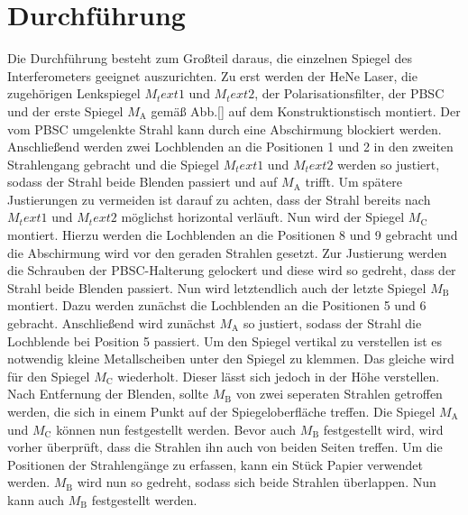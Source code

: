 
\section{Durchführung}
\label{sec:Durchführung}
Die Durchführung besteht zum Großteil daraus, die einzelnen Spiegel des Interferometers geeignet auszurichten. %
Zu erst werden der HeNe Laser, die zugehörigen Lenkspiegel $M_text{1}$ und $M_text{2}$, der Polarisationsfilter, der PBSC und der erste Spiegel $M_\text{A}$ gemäß Abb.\ref{} auf dem Konstruktionstisch montiert. Der vom PBSC umgelenkte Strahl kann durch eine Abschirmung blockiert werden. Anschließend werden zwei Lochblenden an die Positionen 1 und 2 in den zweiten Strahlengang gebracht und die Spiegel $M_text{1}$ und $M_text{2}$ werden so justiert, sodass der Strahl beide Blenden passiert und auf $M_\text{A}$ trifft. Um spätere Justierungen zu vermeiden ist darauf zu achten, dass der Strahl bereits nach $M_text{1}$ und $M_text{2}$ möglichst horizontal verläuft.  Nun wird der Spiegel $M_\text{C}$ montiert. Hierzu werden die Lochblenden an die Positionen 8 und 9 gebracht und die Abschirmung wird vor den geraden Strahlen gesetzt. 
Zur Justierung werden die Schrauben der PBSC-Halterung gelockert und diese wird so gedreht, dass der Strahl beide Blenden passiert. Nun wird letztendlich auch der letzte Spiegel $M_\text{B}$ montiert. Dazu werden zunächst die Lochblenden an die Positionen 5 und 6 gebracht. Anschließend wird zunächst $M_\text{A}$ so justiert, sodass der Strahl die Lochblende bei Position 5 passiert. Um den Spiegel vertikal zu verstellen ist es notwendig kleine Metallscheiben unter den Spiegel zu klemmen. Das gleiche wird für den Spiegel $M_\text{C}$ wiederholt. Dieser lässt sich jedoch in der Höhe verstellen. Nach Entfernung der Blenden, sollte $M_\text{B}$ von zwei seperaten Strahlen getroffen werden, die sich in einem Punkt auf der Spiegeloberfläche treffen.
Die Spiegel $M_\text{A}$ und $M_\text{C}$ können nun festgestellt werden. Bevor auch $M_\text{B}$ festgestellt wird, wird vorher überprüft, dass die Strahlen ihn auch von beiden Seiten treffen. Um die Positionen der Strahlengänge zu erfassen, kann ein Stück Papier verwendet werden. $M_\text{B}$ wird nun so gedreht, sodass sich beide Strahlen überlappen. Nun kann auch $M_\text{B}$ festgestellt werden.
